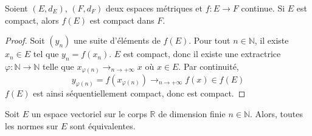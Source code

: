   \begin{proposition}
    \label{equivalence-des-normes-en-dimension-finie-et-theoreme-de-riesz-2}
    Soient $(E,d_E)$, $(F,d_F)$ deux espaces métriques et $f : E \rightarrow F$ continue. Si $E$ est compact, alors $f(E)$ est compact dans $F$.
  \end{proposition}

  \begin{proof}
    Soit $(y_n)$ une suite d'éléments de $f(E)$. Pour tout $n \in \mathbb{N}$, il existe $x_n \in E$ tel que $y_n = f(x_n)$. $E$ est compact, donc il existe une extractrice $\varphi : \mathbb{N} \rightarrow \mathbb{N}$ telle que $x_{\varphi(n)} \longrightarrow_{n \rightarrow +\infty} x$ où $x \in E$. Par continuité,
    \[ y_{\varphi(n)} = f(x_{\varphi(n)}) \longrightarrow_{n \rightarrow +\infty} f(x) \in f(E) \]
    $f(E)$ est ainsi séquentiellement compact, donc est compact.
  \end{proof}

  \begin{theorem}
    Soit $E$ un espace vectoriel sur le corps $\mathbb{R}$ de dimension finie $n \in \mathbb{N}$. Alors, toutes les normes sur $E$ sont équivalentes.
  \end{theorem}

